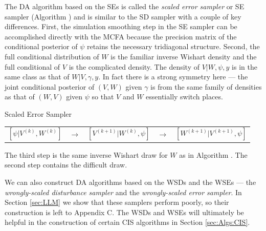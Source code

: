 \documentclass[12pt]{article}
\begin{document}
The DA algorithm based on the SEs is called the {\it scaled error sampler} or SE sampler (Algorithm ) and is similar to the SD sampler with a couple of key differences. First, the simulation smoothing step in the SE sampler can be accomplished directly with the MCFA because the precision matrix of the conditional posterior of $\psi$ retains the necessary tridiagonal structure. Second, the full conditional distribution of $W$ is the familiar inverse Wishart density and the full conditional of $V$ is the complicated density. The density of $V|W,\psi,y$ is in the same class as that of $W|V,\gamma,y$. In fact there is a strong symmetry here --- the joint conditional posterior of $(V,W)$ given $\gamma$ is from the same family of densities as that of $(W,V)$ given $\psi$ so that $V$ and $W$ essentially switch places.
\begin{alg*}[SE]Scaled Error Sampler\label{alg:DLMerror}
{\small
\begin{center}
\begin{tabular}{lllll}
$[\psi|V^{(k)},W^{(k)}]$ & $\to$ & $[V^{(k+1)}|W^{(k)},\psi]$ & $\to$ & $[W^{(k+1)}|V^{(k+1)},\psi]$
\end{tabular}
\end{center}
}
\end{alg*}
\noindent The third step is the same inverse Wishart draw for $W$ as in Algorithm . The second step contains the difficult draw.

We can also construct DA algorithms based on the WSDs and the WSEs --- the {\it wrongly-scaled disturbance sampler} and the {\it wrongly-scaled error sampler}. In Section \ref{sec:LLM} we show that these samplers perform poorly, so their construction is left to Appendix C. The WSDs and WSEs will ultimately be helpful in the construction of certain CIS algorithms in Section \ref{sec:Algs:CIS}.
\end{document}
